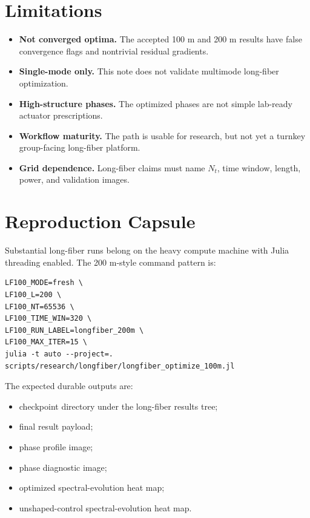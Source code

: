 \documentclass[11pt]{article}
\begin{document}
\section{Limitations}

\begin{itemize}
    \item \textbf{Not converged optima.} The accepted 100 m and 200 m results
    have false convergence flags and nontrivial residual gradients.
    \item \textbf{Single-mode only.} This note does not validate multimode
    long-fiber optimization.
    \item \textbf{High-structure phases.} The optimized phases are not simple
    lab-ready actuator prescriptions.
    \item \textbf{Workflow maturity.} The path is usable for research, but not
    yet a turnkey group-facing long-fiber platform.
    \item \textbf{Grid dependence.} Long-fiber claims must name \(N_t\), time
    window, length, power, and validation images.
\end{itemize}

\section{Reproduction Capsule}

Substantial long-fiber runs belong on the heavy compute machine with Julia
threading enabled. The 200 m-style command pattern is:
\begin{verbatim}
LF100_MODE=fresh \
LF100_L=200 \
LF100_NT=65536 \
LF100_TIME_WIN=320 \
LF100_RUN_LABEL=longfiber_200m \
LF100_MAX_ITER=15 \
julia -t auto --project=. scripts/research/longfiber/longfiber_optimize_100m.jl
\end{verbatim}

The expected durable outputs are:
\begin{itemize}
    \item checkpoint directory under the long-fiber results tree;
    \item final result payload;
    \item phase profile image;
    \item phase diagnostic image;
    \item optimized spectral-evolution heat map;
    \item unshaped-control spectral-evolution heat map.
\end{itemize}
\end{document}
